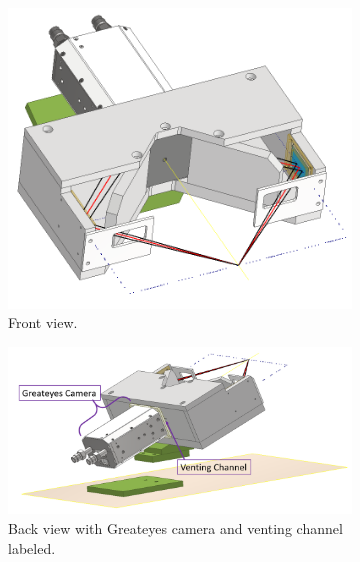 \begin{figure} [H]
	\centering
	\begin{subfigure}[t]{0.34\textwidth}
		\includegraphics[width=\textwidth]{InventorPics/FullDUCC.PNG}
		\caption{Front view.}
		\label{InvDUCCFullFront}
	\end{subfigure}%
	\hfill
	\begin{subfigure}[t]{0.64\textwidth}
	\centering
		\includegraphics[width=\textwidth]{InventorPics/FullDUCCBack.PNG}
		\caption{Back view with Greateyes camera and venting 
		channel 
		labeled.}
		\label{InvDUCCFullBack}
	\end{subfigure}\\[1ex]
	\centering
	\begin{subfigure}[t]{0.35\textwidth}

\end{subfigure}
\end{figure}
